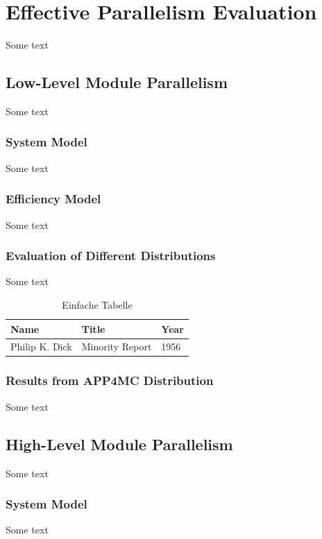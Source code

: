 \chapter{Effective Parallelism Evaluation}
Some text \\
\section{Low-Level Module Parallelism} %
Some text \\
\subsection{System Model}
Some text \\
\subsection{Efficiency Model}
Some text \\
\subsection{Evaluation of Different Distributions}
Some text \\

\begin{table}[h!]
	\begin{tabular}{|l|l|l|}
		\hline
		Name & Title & Year \\
		\hline
		\hline
		Philip K. Dick & Minority Report & 1956 \\
		\hline
	\end{tabular}
	\caption{Einfache Tabelle}
	\label{properties_coremonitoring}
\end{table}
\subsection{Results from APP4MC Distribution}
Some text \\
\section{High-Level Module Parallelism}
Some text \\
\subsection{System Model}
Some text \\
